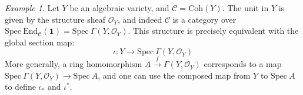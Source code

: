 \documentclass[12pt]{amsart}
\numberwithin{equation}{section}
\theoremstyle{definition}
\theoremstyle{remark}
\newtheorem{example}[theorem]{Example}
\DeclareMathOperator{\Hom}{Hom}
\newcommand{\cat}{\mathcal{C}}
\newcommand{\CO}{\mathcal{O}}
\renewcommand{\1}{\mathbf{1}}
\newcommand{\coh}{\mathrm{Coh}}
\newcommand{\End}{\mathrm{End}}
\newcommand{\spec}{\mathrm{Spec}}
\begin{document}

\begin{example}
Let $Y$ be an algebraic variety, and $\cat=\coh(Y)$. The unit in $Y$ is given by the structure sheaf $\CO_Y$, and indeed $\cat$ is a category over $\spec\ \End_{\cat}(\1)=\spec\ \Gamma(Y,\CO_Y)$. This structure is precisely equivalent with the global section map:
$$
\iota : Y\to \spec\ \Gamma(Y,\CO_Y)
 $$
More generally, a ring homomorphism $A\stackrel{f}\rightarrow \Gamma(Y,\CO_Y)$ corresponds to a map $\spec\ \Gamma(Y,\CO_Y)\to \spec\ A$, and one can use the composed map from $Y$ to $\spec \ A$ to define $\iota_*$ and $\iota^*$.
\end{example}







\end{document}
